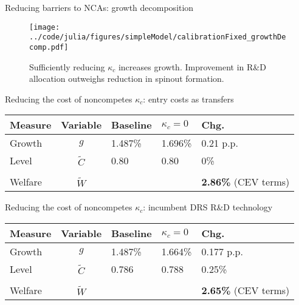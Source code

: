 \documentclass[english,usenames,dvipsnames]{beamer}
\begin{document}
\begin{frame}{Reducing barriers to NCAs: growth decomposition} \label{plots:reducing_kappa_c2} 
	\hyperlink{reducing_kappa_c_table}{}
	\begin{figure}[]
		\texttt{[image: ../code/julia/figures/simpleModel/calibrationFixed\_growthDecomp.pdf]}
		\caption{Sufficiently reducing $\kappa_c$ increases growth. Improvement in R\&D allocation outweighs reduction in spinout formation.}
	\end{figure}
\end{frame}

\begin{frame}{Reducing the cost of noncompetes $\kappa_c$: entry costs as transfers}\label{reducing_kappa_c_table:entry_costs_as_transfers}
	\hyperlink{reducing_kappa_c_table}{}
	\begin{table}
		\centering
		\small
		\begin{tabular}{lclll}
			\toprule \toprule
			Measure & Variable & Baseline & $\kappa_c = 0$ & Chg. \tabularnewline
			\midrule
			Growth & $g$ & 1.487\% & 1.696\% & 0.21 p.p. \tabularnewline
			Level & $\tilde{C}$  & 0.80 &  0.80 & 0\% \tabularnewline 
			\tabularnewline
			Welfare & $\tilde{W}$  &  & & \alert{\textbf{2.86\%}} (CEV terms)  \tabularnewline
			\bottomrule
		\end{tabular}
	\end{table}
\end{frame}

\begin{frame}{Reducing the cost of noncompetes $\kappa_c$: incumbent DRS R\&D technology}\label{reducing_kappa_c_table:incumbentDRS}
	\hyperlink{reducing_kappa_c_table}{}
	\hyperlink{policy:magnitudeOfGrowthIncrease}{}
	\begin{table}
		\centering
		\small
		\begin{tabular}{lclll}
			\toprule \toprule
			Measure & Variable & Baseline & $\kappa_c = 0$ & Chg. \tabularnewline
			\midrule
			Growth & $g$ & 1.487\% & 1.664\% & 0.177 p.p. \tabularnewline
			Level & $\tilde{C}$  & 0.786 &  0.788 & 0.25\% \tabularnewline 
			\tabularnewline
			Welfare & $\tilde{W}$  &  & & \alert{\textbf{2.65\%}} (CEV terms)  \tabularnewline
			\bottomrule
		\end{tabular}
	\end{table}
	\hyperlink{decomposition_growth_increase:incumbentDRS}{}
	\hyperlink{parameters:incumbentDRS}{}
\end{frame}
\end{document}
